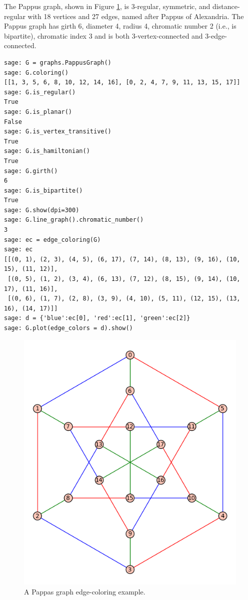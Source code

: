 \begin{example}
\label{eg:graph_coloring:pappas_graph_edge_coloring_example}
The Pappus graph, shown in Figure
\ref{fig:graph_coloring:pappas_graph_edge_coloring_example},
 is $3$-regular, symmetric, and distance-regular with 18 vertices and
27 edges, named after Pappus of Alexandria.
The Pappus graph has girth 6, diameter 4, radius 4, chromatic number
2 (i.e., is bipartite),
chromatic index 3 and is both 3-vertex-connected and 3-edge-connected.
\end{example}

\begin{lstlisting}
sage: G = graphs.PappusGraph()
sage: G.coloring()
[[1, 3, 5, 6, 8, 10, 12, 14, 16], [0, 2, 4, 7, 9, 11, 13, 15, 17]]
sage: G.is_regular()
True
sage: G.is_planar()
False
sage: G.is_vertex_transitive()
True
sage: G.is_hamiltonian()
True
sage: G.girth()
6
sage: G.is_bipartite()
True
sage: G.show(dpi=300)
sage: G.line_graph().chromatic_number()
3
sage: ec = edge_coloring(G)
sage: ec
[[(0, 1), (2, 3), (4, 5), (6, 17), (7, 14), (8, 13), (9, 16), (10, 15), (11, 12)],
 [(0, 5), (1, 2), (3, 4), (6, 13), (7, 12), (8, 15), (9, 14), (10, 17), (11, 16)],
 [(0, 6), (1, 7), (2, 8), (3, 9), (4, 10), (5, 11), (12, 15), (13, 16), (14, 17)]]
sage: d = {'blue':ec[0], 'red':ec[1], 'green':ec[2]}
sage: G.plot(edge_colors = d).show()
\end{lstlisting}

\begin{figure}[!htbp]
\centering
{}
\includegraphics[scale=0.7]{image/graph-coloring/pappas-graph-edge-coloring-example}
\caption{A Pappas graph edge-coloring example.}
\label{fig:graph_coloring:pappas_graph_edge_coloring_example}
\end{figure}

